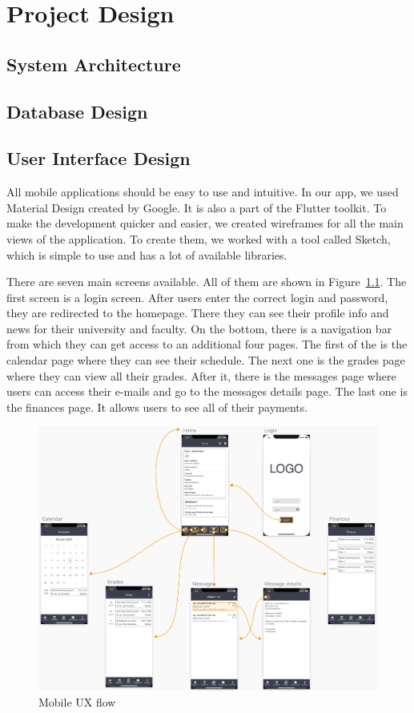 \chapter{Project Design}
\section{System Architecture}
\section{Database Design}
\section{User Interface Design}

All mobile applications should be easy to use and intuitive. In our app, we used Material Design created by Google. It is also a part of the Flutter toolkit. To make the development quicker and easier, we created wireframes for all the main views of the application. To create them, we worked with a tool called Sketch, which is simple to use and has a lot of available libraries.

There are seven main screens available. All of them are shown in Figure~\ref{fig:ux-flow}. The first screen is a login screen. After users enter the correct login and password, they are redirected to the homepage. There they can see their profile info and news for their university and faculty. On the bottom, there is a navigation bar from which they can get access to an additional four pages. The first of the is the calendar page where they can see their schedule. The next one is the grades page where they can view all their grades. After it, there is the messages page where users can access their e-mails and go to the messages details page. The last one is the finances page. It allows users to see all of their payments.

\begin{figure}[htb]
    \centering
    \includegraphics[width=\textwidth]{fig04/mobile_ux_flow.png}
    \caption{Mobile UX flow}
    \label{fig:ux-flow}
\end{figure}

